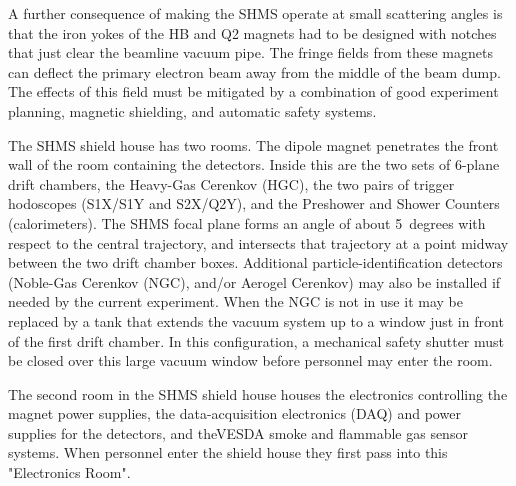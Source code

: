 {A further consequence of making the SHMS operate at small scattering angles is
that the iron yokes of the HB and Q2 magnets had to be designed with notches 
that just clear the beamline vacuum pipe. The fringe fields from these magnets can
deflect the primary electron beam away from the middle of the beam dump. 
The effects of this field
must be mitigated by a combination of good experiment planning, magnetic shielding, 
and automatic safety systems.

The SHMS shield house has two rooms. The dipole magnet penetrates the front
wall of the room containing the detectors. Inside this are the two sets of 6-plane
drift chambers, the Heavy-Gas Cerenkov (HGC), the two pairs of trigger hodoscopes 
(S1X/S1Y and S2X/Q2Y), and
the Preshower and Shower Counters (calorimeters). The SHMS focal plane forms an 
angle of about 5~degrees with respect to the central trajectory, 
and intersects that trajectory at
a point midway between the two drift chamber boxes. Additional  particle-identification
detectors (Noble-Gas Cerenkov (NGC), and/or Aerogel Cerenkov) may also be 
installed if needed by the current experiment. When the NGC is not in use it may
be replaced by a tank that extends the vacuum system up  to a window just in
front of the first drift chamber. In this configuration, a mechanical safety shutter
must be closed over this large vacuum window before personnel may enter the
room.

The second room in the SHMS shield house houses the
electronics controlling the magnet power supplies, the data-acquisition 
electronics (DAQ) and power supplies for the detectors, and theVESDA
smoke and flammable gas sensor systems. When personnel enter the shield
house they first pass into this "Electronics Room". 
}

